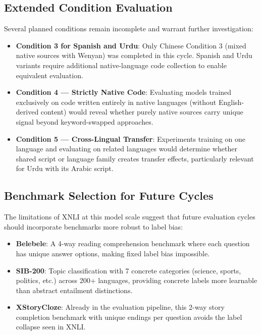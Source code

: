 \documentclass[conference]{IEEEtran}
\begin{document}
\subsection{Extended Condition Evaluation}
Several planned conditions remain incomplete and warrant further investigation:
\begin{itemize}
\item \textbf{Condition 3 for Spanish and Urdu}: Only Chinese Condition 3 (mixed native sources with Wenyan) was completed in this cycle. Spanish and Urdu variants require additional native-language code collection to enable equivalent evaluation.
\item \textbf{Condition 4 — Strictly Native Code}: Evaluating models trained exclusively on code written entirely in native languages (without English-derived content) would reveal whether purely native sources carry unique signal beyond keyword-swapped approaches.
\item \textbf{Condition 5 — Cross-Lingual Transfer}: Experiments training on one language and evaluating on related languages would determine whether shared script or language family creates transfer effects, particularly relevant for Urdu with its Arabic script.
\end{itemize}

\subsection{Benchmark Selection for Future Cycles}
The limitations of XNLI at this model scale suggest that future evaluation cycles should incorporate benchmarks more robust to label bias:
\begin{itemize}
\item \textbf{Belebele}: A 4-way reading comprehension benchmark where each question has unique answer options, making fixed label bias impossible.
\item \textbf{SIB-200}: Topic classification with 7 concrete categories (science, sports, politics, etc.) across 200+ languages, providing concrete labels more learnable than abstract entailment distinctions.
\item \textbf{XStoryCloze}: Already in the evaluation pipeline, this 2-way story completion benchmark with unique endings per question avoids the label collapse seen in XNLI.
\end{itemize}
\end{document}
